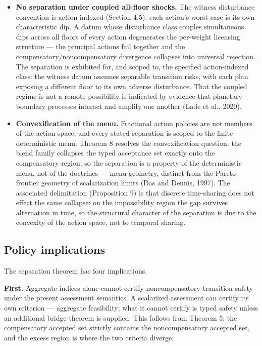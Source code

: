 \documentclass[review,11pt]{elsarticle}
\begin{document}
\begin{itemize}
  \(\mathcal{V}_{\mathrm{typ}} \subseteq \mathcal{V}_{\mathrm{weak}} \subseteq \mathcal{V}_{\mathrm{phys}}\)
  is a theorem about the defined operators under common action and
  disturbance classes, common safe-set inclusion, common horizon, common
  tube semantics, and common terminal condition. It does not establish a
  universal ranking of endpoint, weak, and strong sustainability
  doctrines.
\item
  \textbf{No separation under coupled all-floor shocks.} The witness
  disturbance convention is action-indexed (Section 4.5): each action's
  worst case is its own characteristic dip. A datum whose disturbance
  class couples simultaneous dips across all floors of every action
  degenerates the per-weight licensing structure --- the principal
  actions fail together and the compensatory/noncompensatory divergence
  collapses into universal rejection. The separation is exhibited for, and scoped to, the specified action-indexed class: the witness datum assumes separable transition risks, with each plan exposing a different floor to its own adverse disturbance. That the coupled regime is not a remote possibility is indicated by evidence that planetary-boundary processes interact and amplify one another (Lade et al., 2020).
\item
  \textbf{Convexification of the menu.} Fractional action policies are
  not members of the action space, and every stated separation is scoped
  to the finite deterministic menu. Theorem 8 resolves the convexification question: the blend family collapses the typed acceptance set exactly onto the compensatory
  region, so the separation is a property of the deterministic menu, not
  of the doctrines --- menu geometry, distinct from the Pareto-frontier
  geometry of scalarization limits (Das and Dennis, 1997). The
  associated delimitation (Proposition 9) is that discrete time-sharing
  does not effect the same collapse: on the impossibility region the gap
  survives alternation in time, so the structural character of the separation is due to the convexity of the action space, not to temporal sharing.
\end{itemize}

\subsection{Policy implications}\label{policy-implications}

The separation theorem has four implications.

\textbf{First.} Aggregate indices alone cannot certify noncompensatory
transition safety under the present assessment semantics. A scalarized
assessment can certify its own criterion --- aggregate feasibility; what
it cannot certify is typed safety unless an additional bridge theorem is
supplied. This follows from Theorem 5: the compensatory accepted set
strictly contains the noncompensatory accepted set, and the excess
region is where the two criteria diverge.
\end{document}
